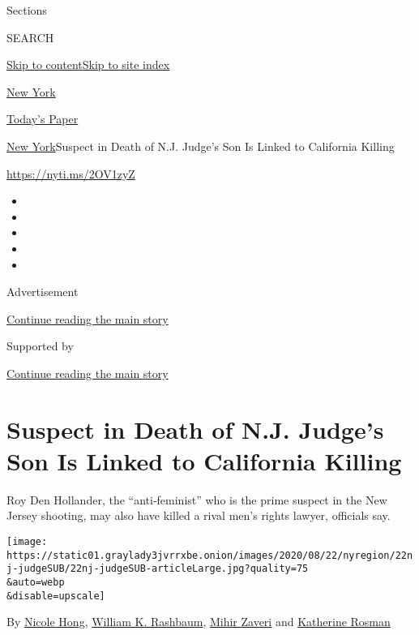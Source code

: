 Sections

SEARCH

\protect\hyperlink{site-content}{Skip to
content}\protect\hyperlink{site-index}{Skip to site index}

\href{https://www.nytimes3xbfgragh.onion/section/nyregion}{New York}

\href{https://myaccount.nytimes3xbfgragh.onion/auth/login?response_type=cookie\&client_id=vi}{}

\href{https://www.nytimes3xbfgragh.onion/section/todayspaper}{Today's
Paper}

\href{/section/nyregion}{New York}\textbar{}Suspect in Death of N.J.
Judge's Son Is Linked to California Killing

\url{https://nyti.ms/2OV1zyZ}

\begin{itemize}
\item
\item
\item
\item
\item
\end{itemize}

Advertisement

\protect\hyperlink{after-top}{Continue reading the main story}

Supported by

\protect\hyperlink{after-sponsor}{Continue reading the main story}

\hypertarget{suspect-in-death-of-nj-judges-son-is-linked-to-california-killing}{%
\section{Suspect in Death of N.J. Judge's Son Is Linked to California
Killing}\label{suspect-in-death-of-nj-judges-son-is-linked-to-california-killing}}

Roy Den Hollander, the ``anti-feminist'' who is the prime suspect in the
New Jersey shooting, may also have killed a rival men's rights lawyer,
officials say.

\texttt{[image: https://static01.graylady3jvrrxbe.onion/images/2020/08/22/nyregion/22nj-judgeSUB/22nj-judgeSUB-articleLarge.jpg?quality=75\\\&auto=webp\\\&disable=upscale]}

By \href{https://www.nytimes3xbfgragh.onion/by/nicole-hong}{Nicole
Hong},
\href{https://www.nytimes3xbfgragh.onion/by/william-k-rashbaum}{William
K. Rashbaum},
\href{https://www.nytimes3xbfgragh.onion/by/mihir-zaveri}{Mihir Zaveri}
and
\href{https://www.nytimes3xbfgragh.onion/by/katherine-rosman}{Katherine
Rosman}


